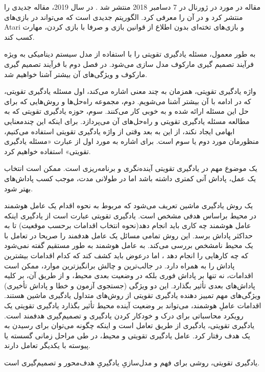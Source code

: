 مقاله
  در مورد
    در ژورنال
در 7 دسامبر 2018 منتشر شد
\cite{silver2018general}.
در سال 2019،
مقاله جدیدی را منتشر کرد و در آن
را معرفی کرد. 
الگوریتم جدیدی است که می‌تواند در بازی‌های Atari و بازی‌های تخته‌ای 
 بدون اطلاع از قوانین بازی و صرفا با بازی کردن، مهارت کسب کند.


به طور معمول، مسئله یادگیری تقویتی را با استفاده از مدل سیستم دینامیکی به ویژه فرآیند تصمیم گیری مارکوف مدل سازی می‌شود. در فصل دوم با فرآیند تصمیم گیری مارکوف و ویژگی‌های آن بیشتر آشنا خواهیم شد.

واژه یادگیری تقویتی، همزمان به چند معنی اشاره می‌کند، اول مسئله یادگیری تقویتی، که در ادامه با آن بیشتر آشنا می‌شویم. دوم، مجموعه راه‌حل‌ها و روش‌هایی که برای حل این مسئله ارائه شده و به خوبی کار می‌کنند. سوم، حوزه یادگیری تقویتی که به مطالعه مسئله یادگیری تقویتی و راه‌حل‌های آن می‌پردازد. برای اینکه این چندمعنایی ابهامی ایجاد نکند، از این به بعد وقتی از واژه یادگیری تقویتی استفاده می‌کنیم، منظورمان  مورد دوم یا سوم است. برای اشاره به مورد اول از عبارت «مسئله یادگیری تقویتی» استفاده خواهیم کرد. 

یک موضوع مهم در یادگیری تقویتی آینده‌نگری و برنامه‌ریزی است. ممکن است انتخاب یک عمل، پاداش آنی کمتری داشته باشد اما در طولانی مدت، موجب کسب پاداش‌های بهتر شود. 

یک روش یادگیری ماشین تعریف می‌شود که مربوط به نحوه اقدام یک عامل هوشمند  در محیط براساس هدفی مشخص است. یادگیری تقویتی عبارت است از یادگیری اینکه عامل هوشمند چه کاری باید انجام دهد(نحوه انتخاب اقدامات برحسب موقعیت) تا به حداکثر پاداش برسد. این روش تمامی‌ مسائل یک عامل هدفمند را صریحا در تعامل با یک محیط نامشخص بررسی می‌کند. به عامل هوشمند به طور مستقیم گفته نمی‌شود که چه کارهایی را انجام دهد ، اما درعوض باید کشف کند که کدام اقدامات بیشترین پاداش را به همراه دارد. در جالب‌ترین و چالش برانگیزترین موارد، ممکن است اقدامات، نه تنها بر پاداش فوری بلکه در وضعیت بعدی محیط، و از طریق آن، بر کلیه پاداش‌های بعدی تأثیر بگذارد. این دو ویژگی (جستجوی آزمون و خطا و پاداش تأخیری) ویژگی‌های مهم تمییز دهنده یادگیری تقویتی از روش‌های متداول یادگیری ماشین هستند.
اقدامات عاملِ هوشمند، می‌تواند بر وضعیت آینده محیط تأثیر بگذارد
یادگیری تقویتی یک رویکرد محاسباتی برای درک و خودکار کردن یادگیری و تصمیم‌گیری هدفمند است.
یادگیری تقویتی، یادگیری از  طریق تعامل است و اینکه چگونه می‌توان برای رسیدن به یک هدف رفتار کرد.
عامل یادگیری تقویتی و محیط، در طی مراحل زمانی گسسته یا پیوسته با یکدیگر تعامل دارند.

یادگیری تقویتی، روشی برای فهم و مدل‌سازیِ یادگیریِ هدف‌محور و تصمیم‌گیری است.

